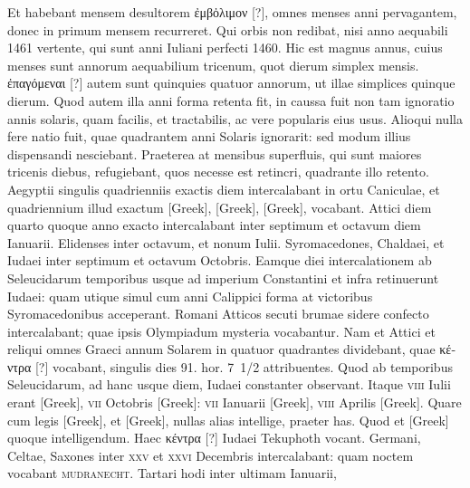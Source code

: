 Et habebant mensem desultorem
\textgreek{ἐμβὀλιμον [?]}, omnes menses anni pervagantem, donec in primum
mensem recurreret.
Qui orbis non redibat, nisi anno aequabili 1461
vertente, qui sunt anni Iuliani perfecti 1460.
Hic est magnus annus,
cuius menses sunt annorum aequabilium tricenum, quot dierum simplex
mensis.
\textgreek{ἐπαγόμεναι [?]} autem sunt quinquies quatuor annorum, ut
illae simplices quinque dierum.
Quod autem illa anni forma retenta
fit, in caussa fuit non tam ignoratio annis solaris,
 quam facilis, et tractabilis, ac vere popularis eius usus.
Alioqui nulla fere natio fuit, quae
quadrantem anni Solaris ignorarit: sed modum illius dispensandi
nesciebant.
Praeterea at mensibus superfluis, qui sunt maiores tricenis
diebus, refugiebant, quos necesse est retincri,
 quadrante illo retento.
Aegyptii singulis quadrienniis exactis diem intercalabant
 in ortu Caniculae,
et quadriennium illud exactum \textgreek{[Greek]}, \textgreek{[Greek]},
\textgreek{[Greek]}, vocabant.
Attici diem quarto quoque anno exacto intercalabant
inter septimum et octavum diem Ianuarii.
Elidenses inter
octavum, et nonum Iulii.
Syromacedones, Chaldaei, et Iudaei inter
septimum et octavum Octobris.
Eamque diei intercalationem ab Seleucidarum
temporibus usque ad imperium Constantini et infra retinuerunt
Iudaei: quam utique simul cum anni Calippici forma at victoribus
Syromacedonibus acceperant.
Romani Atticos secuti brumae
sidere confecto intercalabant; quae ipsis Olympiadum mysteria vocabantur.
Nam et Attici et reliqui omnes Graeci annum Solarem in
quatuor quadrantes dividebant, quae \textgreek{κέντρα [?]}
 vocabant, singulis dies 91.
hor. 7~1/2 attribuentes.
Quod ab temporibus Seleucidarum, ad hanc usque
diem, Iudaei constanter observant.
Itaque \textsc{viii} Iulii erant \textgreek{[Greek]},
\textsc{vii} Octobris \textgreek{[Greek]}:
 \textsc{vii} Ianuarii \textgreek{[Greek]}, \textsc{viii}
Aprilis \textgreek{[Greek]}.
Quare cum legis \textgreek{[Greek]}, et \textgreek{[Greek]},
nullas alias intellige, praeter has.
Quod et \textgreek{[Greek]} quoque intelligendum.
Haec \textgreek{κέντρα [?]} Iudaei Tekuphoth vocant.
Germani, Celtae,
Saxones inter \textsc{xxv} et \textsc{xxvi} Decembris intercalabant:
 quam noctem
vocabant \textsc{mudranecht}.
Tartari hodi inter ultimam Ianuarii,
